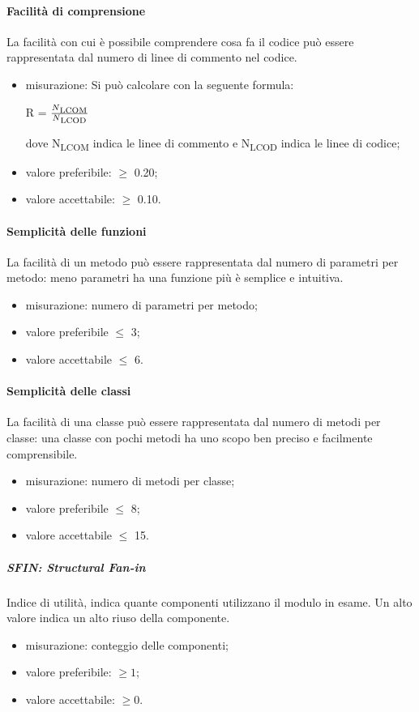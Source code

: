 			\paragraph{Facilità di comprensione}
			La facilità con cui è possibile comprendere cosa fa il codice può essere rappresentata dal numero di linee di commento nel codice.
			\begin{itemize}
			\item misurazione: Si può calcolare con la seguente formula: \\
			\centerline{R = \(\frac{N\textsubscript{LCOM}}{N\textsubscript{LCOD}} \) }
			dove N\textsubscript{LCOM} indica le linee di commento e N\textsubscript{LCOD} indica le linee di codice;
			\item valore preferibile: $\geq$ 0.20;
			\item valore accettabile: $\geq$ 0.10.
			\end{itemize}
			\paragraph{Semplicità delle funzioni}
			La facilità di un metodo può essere rappresentata dal numero di parametri per metodo: meno parametri ha una funzione più è semplice e intuitiva.
			\begin{itemize}
			\item misurazione: numero di parametri per metodo;
			\item valore preferibile $\leq$ 3;
			\item valore accettabile $\leq$ 6.
			\end{itemize}
			\paragraph{Semplicità delle classi}
			La facilità di una classe può essere rappresentata dal numero di metodi per classe: una classe con pochi metodi ha uno scopo ben preciso e facilmente comprensibile.
			\begin{itemize}
			\item misurazione: numero di metodi per classe;
			\item valore preferibile $\leq$ 8;
			\item valore accettabile $\leq$ 15.
			\end{itemize}			
			
			\subparagraph{SFIN: Structural Fan-in}
			Indice di utilità, indica quante componenti utilizzano il modulo in esame. Un alto valore indica un alto riuso della componente.
			\begin{itemize}
				\item misurazione: conteggio delle componenti;
				\item valore preferibile: $ \geq 1$;
				\item valore accettabile: $ \geq 0$.
			\end{itemize}
			
